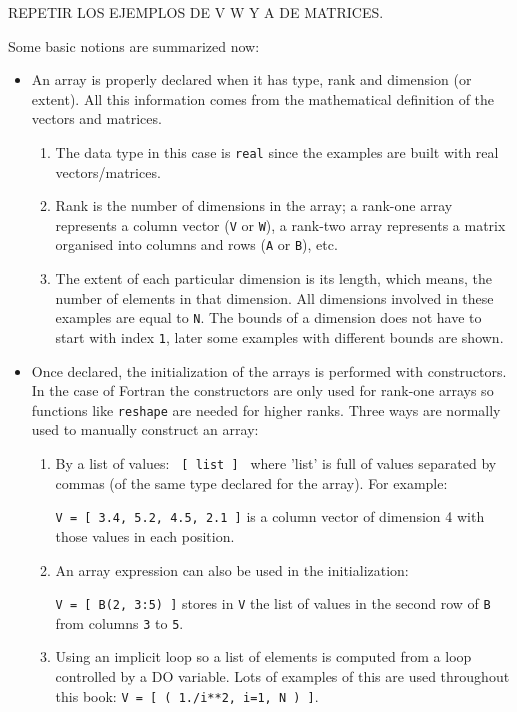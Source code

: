 REPETIR LOS EJEMPLOS DE V W Y A DE MATRICES. 

Some basic notions are summarized now: 
\begin{itemize}
    \item An array is properly declared when it has type, rank and dimension (or extent). 
    All this information comes from the mathematical definition of the vectors and matrices.
    
    \begin{enumerate}
        \item The data type in this case is \texttt{real} since the examples are built with real vectors/matrices. 
        \item Rank is the number of dimensions in the array; a rank-one array represents a column vector (\texttt{V} or \texttt{W}), a rank-two array represents a matrix organised into columns and rows (\texttt{A} or \texttt{B}), etc. 
        \item The extent of each particular dimension is its length, which means, the number of elements in that dimension. All dimensions involved in these examples are equal to \texttt{N}. The bounds of a dimension does not have to start with index \texttt{1}, later some examples with different bounds are shown. 
    \end{enumerate}
    
    \item Once declared, the initialization of the arrays is performed with constructors. In the case of Fortran the constructors are only used for rank-one arrays so functions like \texttt{reshape} are needed for higher ranks. Three ways are normally used to manually construct an array:
    
    \begin{enumerate}
        \item By a list of values: \texttt{ [ list ] } where 'list' is full of values separated by commas (of the same type declared for the array). 
        For example: 
        
        \texttt{V = [ 3.4, 5.2, 4.5, 2.1 ]} is a column vector of dimension 4 with those values in each position.
        \item An array expression can also be used in the initialization: 
        
        \texttt{V = [ B(2, 3:5) ]} stores in \texttt{V} the list of values in the second row of \texttt{B} from columns \texttt{3} to \texttt{5}.
        \item Using an implicit loop so a list of elements is computed from a loop controlled by a DO variable. Lots of examples of this are used throughout this book: \texttt{V = [ ( 1./i**2, i=1, N ) ]}.
    \end{enumerate}
    

\end{itemize}
